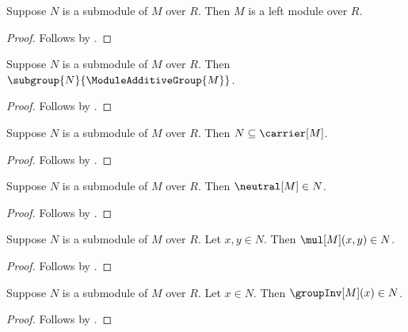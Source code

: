 \begin{proposition}\label{submodule_module}
    Suppose $N$ is a submodule of $M$ over $R$.
    Then $M$ is a left module over $R$.
\end{proposition}
\begin{proof}
    Follows by .
\end{proof}

\begin{proposition}\label{submodule_additive_subgroup}
    Suppose $N$ is a submodule of $M$ over $R$.
    Then $\subgroup{N}{\ModuleAdditiveGroup{M}}$.
\end{proposition}
\begin{proof}
    Follows by .
\end{proof}

\begin{proposition}\label{submodule_subseteq}
    Suppose $N$ is a submodule of $M$ over $R$.
    Then $N\subseteq\carrier[M]$.
\end{proposition}
\begin{proof}
    Follows by
        .
\end{proof}

\begin{proposition}\label{submodule_zero}
    Suppose $N$ is a submodule of $M$ over $R$.
    Then $\neutral[M]\in N$.
\end{proposition}
\begin{proof}
    Follows by
        .
\end{proof}

\begin{proposition}\label{submodule_addition}
    Suppose $N$ is a submodule of $M$ over $R$.
    Let $x,y\in N$.
    Then $\mul[M](x,y)\in N$.
\end{proposition}
\begin{proof}
    Follows by
        .
\end{proof}

\begin{proposition}\label{submodule_negation}
    Suppose $N$ is a submodule of $M$ over $R$.
    Let $x\in N$.
    Then $\groupInv[M](x)\in N$.
\end{proposition}
\begin{proof}
    Follows by
        .
\end{proof}


